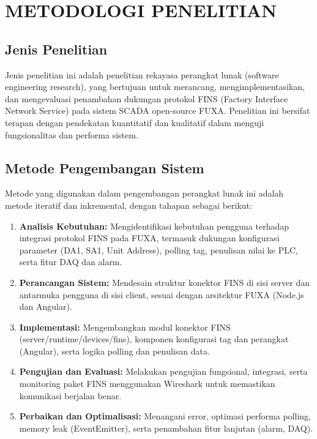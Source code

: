 \chapter{METODOLOGI PENELITIAN}

\section{Jenis Penelitian}
Jenis penelitian ini adalah penelitian rekayasa perangkat lunak (software engineering research), yang bertujuan untuk merancang, mengimplementasikan, dan mengevaluasi penambahan dukungan protokol FINS (Factory Interface Network Service) pada sistem SCADA open-source FUXA. Penelitian ini bersifat terapan dengan pendekatan kuantitatif dan kualitatif dalam menguji fungsionalitas dan performa sistem.

\section{Metode Pengembangan Sistem}
Metode yang digunakan dalam pengembangan perangkat lunak ini adalah metode iteratif dan inkremental, dengan tahapan sebagai berikut:

\begin{enumerate}
    \item \textbf{Analisis Kebutuhan:} Mengidentifikasi kebutuhan pengguna terhadap integrasi protokol FINS pada FUXA, termasuk dukungan konfigurasi parameter (DA1, SA1, Unit Address), polling tag, penulisan nilai ke PLC, serta fitur DAQ dan alarm.
    \item \textbf{Perancangan Sistem:} Mendesain struktur konektor FINS di sisi server dan antarmuka pengguna di sisi client, sesuai dengan arsitektur FUXA (Node.js dan Angular).
    \item \textbf{Implementasi:} Mengembangkan modul konektor FINS (server/runtime/devices/fins), komponen konfigurasi tag dan perangkat (Angular), serta logika polling dan penulisan data.
    \item \textbf{Pengujian dan Evaluasi:} Melakukan pengujian fungsional, integrasi, serta monitoring paket FINS menggunakan Wireshark untuk memastikan komunikasi berjalan benar.
    \item \textbf{Perbaikan dan Optimalisasi:} Menangani error, optimasi performa polling, memory leak (EventEmitter), serta penambahan fitur lanjutan (alarm, DAQ).
\end{enumerate}

